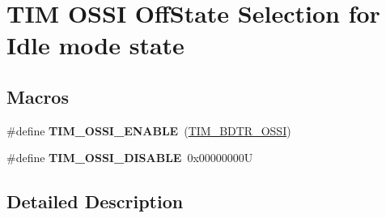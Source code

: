 \hypertarget{group___t_i_m___o_s_s_i___off___state___selection__for___idle__mode__state}{}\section{T\+IM O\+S\+SI Off\+State Selection for Idle mode state}
\label{group___t_i_m___o_s_s_i___off___state___selection__for___idle__mode__state}
\subsection*{Macros}
\begin{DoxyCompactItemize}
\item 
\mbox{\label{group___t_i_m___o_s_s_i___off___state___selection__for___idle__mode__state_gae5b5901b177cd054cd5503630892680f}} 
\#define {\bfseries T\+I\+M\+\_\+\+O\+S\+S\+I\+\_\+\+E\+N\+A\+B\+LE}~(\mbox{\hyperlink{group___peripheral___registers___bits___definition_gab1cf04e70ccf3d4aba5afcf2496a411a}{T\+I\+M\+\_\+\+B\+D\+T\+R\+\_\+\+O\+S\+SI}})
\item 
\mbox{\label{group___t_i_m___o_s_s_i___off___state___selection__for___idle__mode__state_gab1a20c65a3d24ef770f8a2a14c24130b}} 
\#define {\bfseries T\+I\+M\+\_\+\+O\+S\+S\+I\+\_\+\+D\+I\+S\+A\+B\+LE}~0x00000000U
\end{DoxyCompactItemize}


\subsection{Detailed Description}
